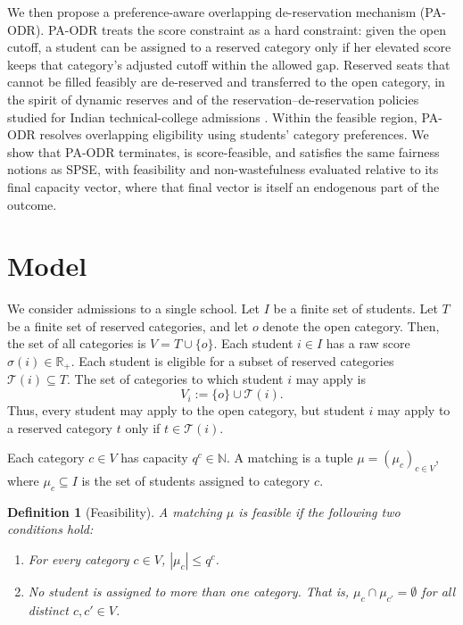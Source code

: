 \documentclass[10pt]{article}
\newtheorem{definition}{Definition}
\newcommand{\T}{\mathcal{T}}
\newcommand{\R}{\mathbb{R}}
\newcommand{\1}{\mathbf{1}}
\begin{document}
We then propose a preference-aware overlapping de-reservation mechanism (PA-ODR). PA-ODR treats the score constraint as a hard constraint: given the open cutoff, a student can be assigned to a reserved category only if her elevated score keeps that category's adjusted cutoff within the allowed gap. Reserved seats that cannot be filled feasibly are de-reserved and transferred to the open category, in the spirit of dynamic reserves \citep{AyTu20a} and of the reservation--de-reservation policies studied for Indian technical-college admissions \citep{AyTu23a}. Within the feasible region, PA-ODR resolves overlapping eligibility using students' category preferences. We show that PA-ODR terminates, is score-feasible, and satisfies the same fairness notions as SPSE, with feasibility and non-wastefulness evaluated relative to its final capacity vector, where that final vector is itself an endogenous part of the outcome.

\section{Model}

We consider admissions to a single school. Let $I$ be a finite set of students. Let $T$ be a finite set of reserved categories, and let $o$ denote the open category. Then, the set of all categories is $V = T \cup \{o\}$.
Each student $i\in I$ has a raw score $\sigma(i)\in\R_+$. Each student is eligible for a subset of reserved categories $\T(i)\subseteq T$. The set of categories to which student $i$ may apply is
\[
V_i := \{o\}\cup \T(i).
\]
Thus, every student may apply to the open category, but student $i$ may apply to a reserved category $t$ only if $t\in\T(i)$.

Each category $c\in V$ has capacity $q^c\in\mathbb{N}$. A matching is a tuple $\mu=(\mu_c)_{c\in V}$, where $\mu_c\subseteq I$ is the set of students assigned to category $c$.

\begin{definition}[Feasibility]
A matching $\mu$ is feasible if the following two conditions hold:
\begin{enumerate}
\item For every category $c\in V$, $|\mu_c|\le q^c$.
\item No student is assigned to more than one category. That is, $\mu_c\cap \mu_{c'}=\emptyset$ for all distinct $c,c'\in V$.
\end{enumerate}
\end{definition}
\end{document}
